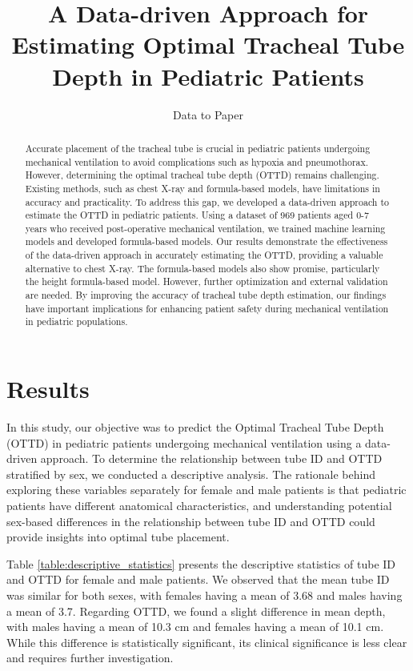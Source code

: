 \documentclass[11pt]{article}
\title{A Data-driven Approach for Estimating Optimal Tracheal Tube Depth in Pediatric Patients}
\author{Data to Paper}
\begin{document}
\maketitle
\begin{abstract}
Accurate placement of the tracheal tube is crucial in pediatric patients undergoing mechanical ventilation to avoid complications such as hypoxia and pneumothorax. However, determining the optimal tracheal tube depth (OTTD) remains challenging. Existing methods, such as chest X-ray and formula-based models, have limitations in accuracy and practicality. To address this gap, we developed a data-driven approach to estimate the OTTD in pediatric patients. Using a dataset of 969 patients aged 0-7 years who received post-operative mechanical ventilation, we trained machine learning models and developed formula-based models. Our results demonstrate the effectiveness of the data-driven approach in accurately estimating the OTTD, providing a valuable alternative to chest X-ray. The formula-based models also show promise, particularly the height formula-based model. However, further optimization and external validation are needed. By improving the accuracy of tracheal tube depth estimation, our findings have important implications for enhancing patient safety during mechanical ventilation in pediatric populations.
\end{abstract}
\section*{Results}

In this study, our objective was to predict the Optimal Tracheal Tube Depth (OTTD) in pediatric patients undergoing mechanical ventilation using a data-driven approach. To determine the relationship between tube ID and OTTD stratified by sex, we conducted a descriptive analysis. The rationale behind exploring these variables separately for female and male patients is that pediatric patients have different anatomical characteristics, and understanding potential sex-based differences in the relationship between tube ID and OTTD could provide insights into optimal tube placement.

Table {}\ref{table:descriptive_statistics} presents the descriptive statistics of tube ID and OTTD for female and male patients. We observed that the mean tube ID was similar for both sexes, with females having a mean of 3.68 and males having a mean of 3.7. Regarding OTTD, we found a slight difference in mean depth, with males having a mean of 10.3 cm and females having a mean of 10.1 cm. While this difference is statistically significant, its clinical significance is less clear and requires further investigation.
\end{document}
